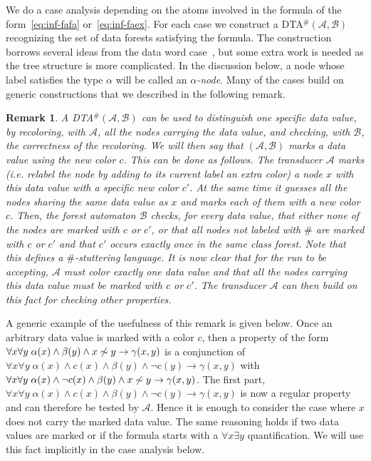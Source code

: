 \documentclass{CSML}
\newtheorem{remark}{Remark}
\newcommand\dataeq{\ensuremath{\sim}}
\newcommand\dad{\textup{DTA}$^\#$\xspace}
\newcommand\Aa{\mathcal{A}}
\newcommand\Ba{\mathcal{B}}
\begin{document}
We do a case analysis depending on the atoms involved in the formula of the
form~\eqref{eq:inf-fafa} or~\eqref{eq:inf-faex}. 
For each case we construct a \dad $(\Aa,\Ba)$ 
recognizing the set of data forests satisfying the formula.  
The construction borrows several ideas from the data word case~\cite{BDMSS11}, but
some extra work is needed as the tree structure is more complicated.
In the discussion below, a node whose label satisfies the type $\alpha$ will
be called an \emph{$\alpha$-node}.
Many of the cases build on generic constructions that we described 
in the following remark.
\begin{remark}\label{remark-color-class}
  A \dad $(\Aa,\Ba)$ can be used to distinguish one specific data value, by recoloring, with $\Aa$, all the nodes carrying the
  data value, and checking, with $\Ba$, the correctness of the recoloring.  We
  will then say that $(\Aa,\Ba)$ \emph{marks a data value using the new color
    $c$}.  This can be done as follows.  The transducer $\Aa$ marks
  (i.e. relabel the node by adding to its current label an extra color) a node $x$ with
  this data value with a specific new color $c'$.  At the same time it guesses
  all the nodes sharing the same data value as $x$ and marks each of them with
  a new color $c$.  Then, the forest automaton $\Ba$ checks, for every data
  value, that either none of the nodes are marked with $c$ or $c'$, or that all
  nodes not labeled with $\#$ are marked with $c$ or $c'$ and that $c'$ occurs
  exactly once in the same class forest.  Note that this defines a
  $\#$-stuttering language.  It is now clear that for the run to be accepting,
  $\Aa$ must color exactly one data value and that all the nodes carrying this
  data value must be marked with $c$ or $c'$.  The transducer $\Aa$ can then
  build on this fact for checking other properties.
\end{remark}

\noindent
A generic example of the usefulness of this remark is given below.
Once an arbitrary data value is marked with a color $c$, 
then a property of the form 
$\forall x \forall y\; \alpha(x) \wedge \beta(y) \wedge x \not\dataeq y \to \gamma(x, y)$ 
is a conjunction of 
$\forall x \forall y\; \alpha(x) \land c(x) \wedge \beta(y) \wedge \lnot c(y) \to \gamma(x,y)$ 
with 
$\forall x \forall y\; \alpha(x) \land \lnot c(x) \wedge \beta(y) \wedge x \not\dataeq y 
 \to \gamma(x, y)$. 
 The first part, 
$\forall x \forall y\; \alpha(x) \land c(x) \wedge \beta(y) \wedge \lnot c(y) 
 \to \gamma(x, y)$ 
is now a regular property and can therefore be tested by $\Aa$. 
Hence it is enough to consider the case where $x$ does not carry the marked data value. 
The same reasoning holds if two data values are marked or if the formula starts with a 
$\forall x \exists y$ quantification. 
We will use this fact implicitly in the case analysis below.
\end{document}
